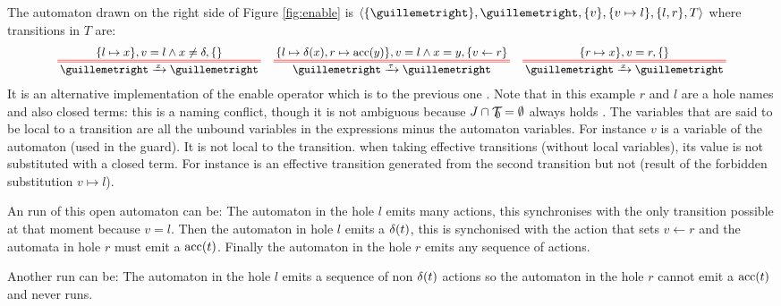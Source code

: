 \documentclass{article}
\begin{document}
\begin{exi}
The automaton drawn on the right side of Figure \ref{fig:enable} is \(\OA{\mbrc{»}}{»}{\mbrc{v}}{\mbrc{v \mapsto l}}{\mbrc{l, r}}{T}\) where transitions in \(T\) are:
\begin{align*}
	\OT{»}{»}{x}{\mbrc{l \mapsto x}}{v = l \wedge x \neq \delta}{\mbrc{}} &&
	\OT{»}{»}{\tau}{\mbrc{l \mapsto \delta\mpar{x}, r \mapsto \act{acc}\mpar{y}}}{v = l \wedge x = y}{\mbrc{v \gets r}} &&
	\OT{»}{»}{x}{\mbrc{r \mapsto x}}{v = r}{\mbrc{}}
\end{align*}
It is an alternative implementation of the enable operator which is  to the previous one \cite{henrio:01299562}. 
Note that in this example \(r\) and \(l\) are a hole names and also closed terms: this is a naming conflict, though it is not ambiguous because \(J \cap {\mathcal{T}}_{\!\!\emptyset} = \emptyset\) always holds . 
The variables that are said to be local to a transition are all the unbound variables in the expressions minus the automaton variables.
For instance \(v\) is a variable of the automaton (used in the guard).
It is not local to the transition.
 when taking effective transitions (without local variables), its value is not substituted with a closed term.
For instance  is an effective transition generated from the second transition but not  (result of the forbidden substitution \(v \mapsto l\)).

An run of this open automaton can be: The automaton in the hole \(l\) emits many actions, this synchronises with the only transition possible at that moment because \(v = l\).
Then the automaton in hole \(l\) emits a \(\delta{\left(t\right)}\), this is synchonised with the action that sets \(v \gets r\) and the automata in hole \(r\) must emit a \(\mathrm{acc}{\left(t\right)}\).
Finally the automaton in the hole \(r\) emits any sequence of actions.

Another run can be: The automaton in the hole \(l\) emits a sequence of non \(\delta{\left(t\right)}\) actions so the automaton in the hole \(r\) cannot emit a \(\mathrm{acc}{\left(t\right)}\) and never runs.
\end{exi}
\end{document}

